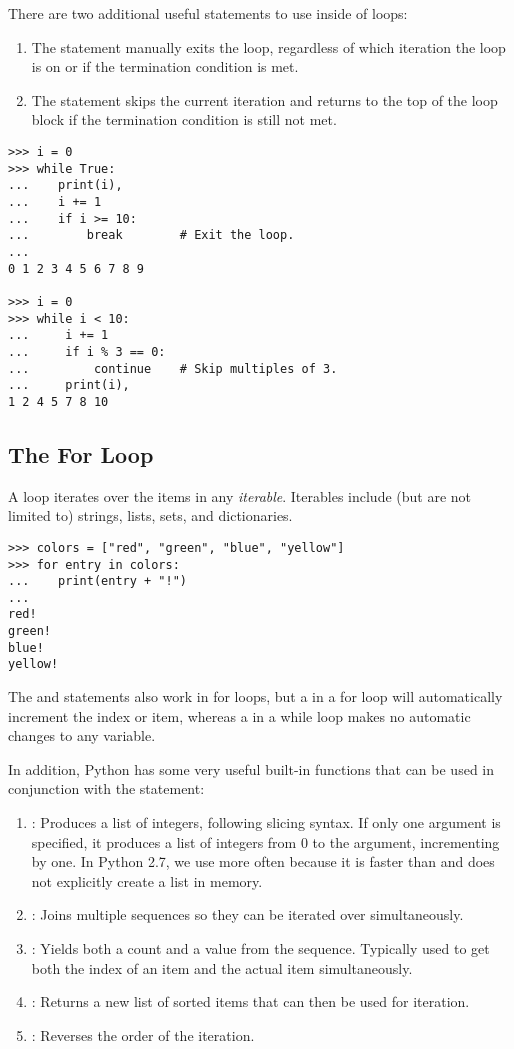 There are two additional useful statements to use inside of loops:
\begin{enumerate}
\item The  statement manually exits the loop, regardless of which iteration the loop is on or if the termination condition is met.
\item The  statement skips the current iteration and returns to the top of the loop block if the termination condition is still not met.
\end{enumerate}

\begin{lstlisting}
>>> i = 0
>>> while True:
...    print(i),
...    i += 1
...    if i >= 10:
...        break        # Exit the loop.
...
0 1 2 3 4 5 6 7 8 9

>>> i = 0
>>> while i < 10:
...     i += 1
...     if i % 3 == 0:
...         continue    # Skip multiples of 3.
...     print(i),
1 2 4 5 7 8 10
\end{lstlisting}

\subsection*{The For Loop}
A  loop iterates over the items in any \emph{iterable}.
Iterables include (but are not limited to) strings, lists, sets, and dictionaries.

\begin{lstlisting}
>>> colors = ["red", "green", "blue", "yellow"]
>>> for entry in colors:
...    print(entry + "!")
...
red!
green!
blue!
yellow!
\end{lstlisting}

The  and  statements also work in for loops, but a  in a for loop will automatically increment the index or item, whereas a  in a while loop makes no automatic changes to any variable.

In addition, Python has some very useful built-in functions that can be used in conjunction with the  statement:
\begin{enumerate}
\item {}: Produces a list of integers, following slicing syntax. If only one argument is specified, it produces a list of integers from 0 to the argument, incrementing by one.
In Python 2.7, we use  more often because it is faster than  and does not explicitly create a list in memory.
\item {}: Joins multiple sequences so they can be iterated over simultaneously.
\item {}: Yields both a count and a value from the sequence. Typically used to get both the index of an item and the actual item simultaneously.
\item {}: Returns a new list of sorted items that can then be used for iteration.
\item {}: Reverses the order of the iteration.
\end{enumerate}

